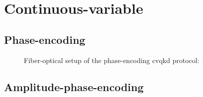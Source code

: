\section{Continuous-variable}



\subsection{Phase-encoding}
\begin{figure}[htb]
	\centering
	
	\caption{Fiber-optical setup of the phase-encoding \gls{cvqkd} protocol:}
\end{figure}

\subsection{Amplitude-phase-encoding}

